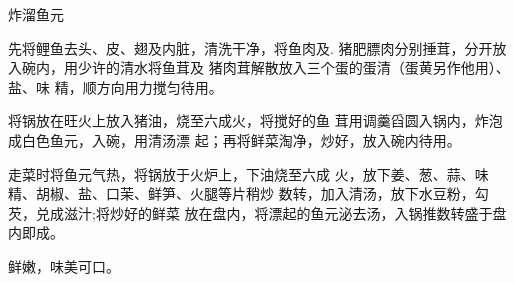 \begin{recipe}{炸溜鱼元}

\ingredients



\cooking

\step 先将鲤鱼去头、皮、翅及内脏，清洗干净，将鱼肉及. 猪肥膘肉分别捶茸，分开放入碗内，用少许的清水将鱼茸及 猪肉茸解散放入三个蛋的蛋清（蛋黄另作他用）、盐、味 精，顺方向用力搅匀待用。

\step 将锅放在旺火上放入猪油，烧至六成火，将搅好的鱼 茸用调羹舀圆入锅内，炸泡成白色鱼元，入碗，用清汤漂 起；再将鲜菜淘净，炒好，放入碗内待用。

\step 走菜时将鱼元气热，将锅放于火炉上，下油烧至六成 火，放下姜、葱、蒜、味精、胡椒、盐、口茉、鲜笋、火腿等片稍炒 数转，加入清汤，放下水豆粉，勾芡，兑成滋汁;将炒好的鲜菜 放在盘内，将漂起的鱼元泌去汤，入锅推数转盛于盘内即成。

\notes

鲜嫩，味美可口。

\end{recipe}


